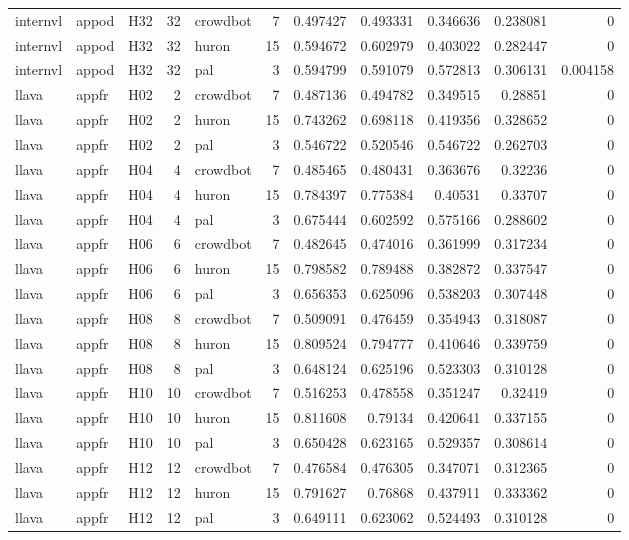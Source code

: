 \begin{longtable}{lllrlrrrrrr}
internvl & appod & H32 & 32 & crowdbot & 7 & 0.497427 & 0.493331 & 0.346636 & 0.238081 & 0 \\
internvl & appod & H32 & 32 & huron & 15 & 0.594672 & 0.602979 & 0.403022 & 0.282447 & 0 \\
internvl & appod & H32 & 32 & pal & 3 & 0.594799 & 0.591079 & 0.572813 & 0.306131 & 0.004158 \\
llava & appfr & H02 & 2 & crowdbot & 7 & 0.487136 & 0.494782 & 0.349515 & 0.28851 & 0 \\
llava & appfr & H02 & 2 & huron & 15 & 0.743262 & 0.698118 & 0.419356 & 0.328652 & 0 \\
llava & appfr & H02 & 2 & pal & 3 & 0.546722 & 0.520546 & 0.546722 & 0.262703 & 0 \\
llava & appfr & H04 & 4 & crowdbot & 7 & 0.485465 & 0.480431 & 0.363676 & 0.32236 & 0 \\
llava & appfr & H04 & 4 & huron & 15 & 0.784397 & 0.775384 & 0.40531 & 0.33707 & 0 \\
llava & appfr & H04 & 4 & pal & 3 & 0.675444 & 0.602592 & 0.575166 & 0.288602 & 0 \\
llava & appfr & H06 & 6 & crowdbot & 7 & 0.482645 & 0.474016 & 0.361999 & 0.317234 & 0 \\
llava & appfr & H06 & 6 & huron & 15 & 0.798582 & 0.789488 & 0.382872 & 0.337547 & 0 \\
llava & appfr & H06 & 6 & pal & 3 & 0.656353 & 0.625096 & 0.538203 & 0.307448 & 0 \\
llava & appfr & H08 & 8 & crowdbot & 7 & 0.509091 & 0.476459 & 0.354943 & 0.318087 & 0 \\
llava & appfr & H08 & 8 & huron & 15 & 0.809524 & 0.794777 & 0.410646 & 0.339759 & 0 \\
llava & appfr & H08 & 8 & pal & 3 & 0.648124 & 0.625196 & 0.523303 & 0.310128 & 0 \\
llava & appfr & H10 & 10 & crowdbot & 7 & 0.516253 & 0.478558 & 0.351247 & 0.32419 & 0 \\
llava & appfr & H10 & 10 & huron & 15 & 0.811608 & 0.79134 & 0.420641 & 0.337155 & 0 \\
llava & appfr & H10 & 10 & pal & 3 & 0.650428 & 0.623165 & 0.529357 & 0.308614 & 0 \\
llava & appfr & H12 & 12 & crowdbot & 7 & 0.476584 & 0.476305 & 0.347071 & 0.312365 & 0 \\
llava & appfr & H12 & 12 & huron & 15 & 0.791627 & 0.76868 & 0.437911 & 0.333362 & 0 \\
llava & appfr & H12 & 12 & pal & 3 & 0.649111 & 0.623062 & 0.524493 & 0.310128 & 0 \\

\end{longtable}
